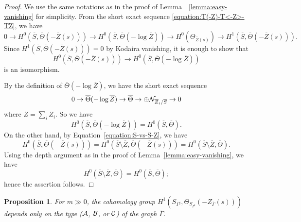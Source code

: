 \documentclass[a4paper, reqno, twoside]{amsart}
\newtheorem{proposition}[theorem]{Proposition}
\theoremstyle{definition}
\numberwithin{equation}{section}
\begin{document}
\begin{proof}
We use the same notations as in the proof of
Lemma~~\ref{lemma:easy-vanishing} for simplicity. From the short exact
sequence \eqref{equation:T(-Z)-T<-Z>-TZ}, we have
\begin{equation*}
0 \to H^0(\overline{S}, \overline{\Theta}(-\overline{Z}(s))) \to
H^0(\overline{S}, \overline{\Theta}(-\log{\overline{Z}})) \to
H^0(\Theta_{\overline{Z}(s)}) \to H^1(\overline{S},
\overline{\Theta}(-\overline{Z}(s))).
\end{equation*}
Since $H^1(\overline{S}, \overline{\Theta}(-\overline{Z}(s)))=0$ by
Kodaira vanishing, it is enough to show that
\[
H^0(\overline{S}, \overline{\Theta}(-\overline{Z}(s))) \to
H^0(\overline{S}, \overline{\Theta}(-\log{\overline{Z}}))
\]
is an isomorphism.

By the definition of $\overline{\Theta}(-\log{\overline{Z}})$, we have the short exact sequence
\begin{equation*}
0 \to \overline{\Theta}(-\log{\overline{Z}}) \to \overline{\Theta} \to
\oplus {\ensuremath \mathcal{N}}_{\overline{Z}_i/\overline{S}} \to 0
\end{equation*}
where $\overline{Z} = \sum _i\overline{Z}_i$. So we have
\[H^0(\overline{S}, \overline{\Theta}(-\log{\overline{Z}})) = H^0(\overline{S}, \overline{\Theta}).\]
On the other hand, by Equation~\eqref{equation:S-vs-S-Z}, we have
\[
H^0(\overline{S}, \overline{\Theta}(-\overline{Z}(s))) =
H^0(\overline{S} \setminus \overline{Z},
\overline{\Theta}(-\overline{Z}(s))) = H^0(\overline{S} \setminus
\overline{Z}, \overline{\Theta}).
\]
Using the depth argument as in the proof of
Lemma~\ref{lemma:easy-vanishing}, we have
\[H^0(\overline{S} \setminus \overline{Z}, \overline{\Theta})=H^0(\overline{S}, \overline{\Theta});\]
hence the assertion follows.
\end{proof}

\begin{proposition}\label{proposition:independent}
For $m \gg 0$, the cohomology group $H^1(S_{\Gamma^{\sharp}},
\Theta_{S_{\Gamma^{\sharp}}}(-Z_{\overline{\Gamma}}(s)))$ depends only on the type (${\ensuremath \mathcal{A}}$, ${\ensuremath \mathcal{B}}$, or ${\ensuremath \mathcal{C}}$) of the graph
$\overline{\Gamma}$.
\end{proposition}
\end{document}
